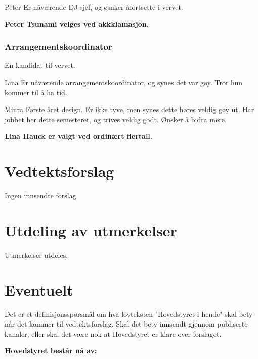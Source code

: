 \documentclass[10pt,norsk,a4paper,usenames,dvipsnames]{article}
\begin{document}
\begin{multicols}
            Peter
            Er nåværende DJ-sjef, og øsnker åfortsette i vervet.

            \textbf{Peter Tsunami velges ved akkklamasjon.}


        \subsubsection{Arrangementskoordinator}

            En kandidat til vervet.

            Lina
            Er nåværende arrangementskoordinator, og synes det var gøy. Tror hun kommer til å ha tid.

            Miura
            Første året design. Er ikke tyve, men synes dette høres veldig gøy ut. Har jobbet her dette semesteret, og trives veldig godt. Ønsker å bidra mere.

            \textbf{Lina Hauck er valgt ved ordinært flertall.}

\end{multicols}



\section{Vedtektsforslag}

    Ingen innsendte forslag


\section{Utdeling av utmerkelser}

Utmerkelser utdeles.


\section{Eventuelt}

    Det er et definisjonsspørsmål om hva lovteksten "Hovedstyret i hende" skal bety når det kommer til vedtektsforslag. Skal det bety innsendt gjennom publiserte kanaler, eller skal det være nok at Hovedstyret er klare over forslaget.


\newpage

\textbf{\huge{Hovedstyret består nå av:}}

\mbox{}
\end{document}

